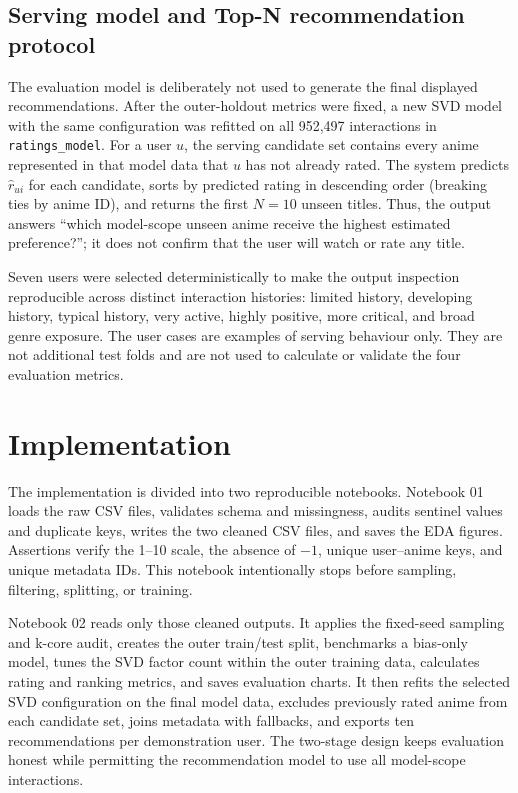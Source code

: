 \documentclass[12pt,a4paper]{article}
\begin{document}
\subsection{Serving model and Top-N recommendation protocol}
The evaluation model is deliberately not used to generate the final displayed recommendations. After the outer-holdout metrics were fixed, a new SVD model with the same configuration was refitted on all 952,497 interactions in \texttt{ratings\_model}. For a user $u$, the serving candidate set contains every anime represented in that model data that $u$ has not already rated. The system predicts $\hat{r}_{ui}$ for each candidate, sorts by predicted rating in descending order (breaking ties by anime ID), and returns the first $N=10$ unseen titles. Thus, the output answers ``which model-scope unseen anime receive the highest estimated preference?''; it does not confirm that the user will watch or rate any title.

Seven users were selected deterministically to make the output inspection reproducible across distinct interaction histories: limited history, developing history, typical history, very active, highly positive, more critical, and broad genre exposure. The user cases are examples of serving behaviour only. They are not additional test folds and are not used to calculate or validate the four evaluation metrics.

\section{Implementation}
The implementation is divided into two reproducible notebooks. Notebook 01 loads the raw CSV files, validates schema and missingness, audits sentinel values and duplicate keys, writes the two cleaned CSV files, and saves the EDA figures. Assertions verify the 1--10 scale, the absence of $-1$, unique user--anime keys, and unique metadata IDs. This notebook intentionally stops before sampling, filtering, splitting, or training.

Notebook 02 reads only those cleaned outputs. It applies the fixed-seed sampling and k-core audit, creates the outer train/test split, benchmarks a bias-only model, tunes the SVD factor count within the outer training data, calculates rating and ranking metrics, and saves evaluation charts. It then refits the selected SVD configuration on the final model data, excludes previously rated anime from each candidate set, joins metadata with fallbacks, and exports ten recommendations per demonstration user. The two-stage design keeps evaluation honest while permitting the recommendation model to use all model-scope interactions.
\end{document}

